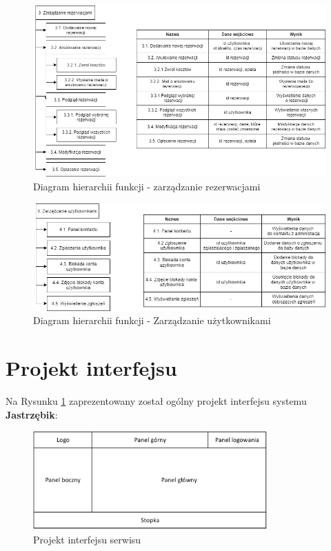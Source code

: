 \documentclass[a4paper,11pt]{article}
\begin{document}
    \begin{figure}[H] 
    	\begin{center}
    		\includegraphics[width=1\textwidth]{img2/HFD-3.png}
            \caption{Diagram hierarchii funkcji - zarządzanie rezerwacjami}
    	\end{center}
    \end{figure}
    
    \begin{figure}[H]
    	\begin{center}
    		\includegraphics[width=1\textwidth]{img2/HFD-4.png}
            \caption{Diagram hierarchii funkcji - Zarządzanie użytkownikami}
    	\end{center}
    \end{figure}

\section{Projekt interfejsu}

    Na Rysunku \ref{fig:projekt} zaprezentowany został ogólny projekt interfejsu systemu \textbf{Jastrzębik}:

    \begin{figure}[H]
    	\begin{center}
    		\includegraphics[width=0.8\textwidth]{img2/Projekt.png}
            \caption{Projekt interfejsu serwisu}
            \label{fig:projekt}
    	\end{center}
    \end{figure}
\end{document}
